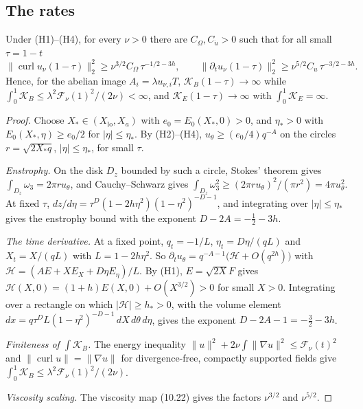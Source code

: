 \subsection{The rates}

\begin{theorem}\label{thm:rates}
Under (H1)--(H4), for every $\nu>0$ there are $C_\Omega,C_{\dot u}>0$ such that for all small $\tau=1-t$
\[
\|\operatorname{curl}u_\nu(1-\tau)\|_2^2\ge\nu^{3/2}C_\Omega\,\tau^{-1/2-3h},\qquad \|\partial_tu_\nu(1-\tau)\|_2^2\ge\nu^{5/2}C_{\dot u}\,\tau^{-3/2-3h}.
\]
Hence, for the abelian image $A_i=\lambda u_{\nu,i}T$, $\mathcal K_B(1-\tau)\to\infty$ while $\int_0^1\mathcal K_B\le\lambda^2\mathcal F_\nu(1)^2/(2\nu)<\infty$, and $\mathcal K_E(1-\tau)\to\infty$ with $\int_0^1\mathcal K_E=\infty$.
\end{theorem}
\begin{proof}
Choose $X_*\in(X_{\mathrm{lo}},X_a)$ with $e_0=E_0(X_*,0)>0$, and $\eta_*>0$ with $E_0(X_*,\eta)\ge e_0/2$ for $|\eta|\le\eta_*$. By (H2)--(H4), $u_\theta\ge(e_0/4)q^{-A}$ on the circles $r=\sqrt{2X_*q}$, $|\eta|\le\eta_*$, for small $\tau$.

\emph{Enstrophy.} On the disk $D_z$ bounded by such a circle, Stokes' theorem gives $\int_{D_z}\omega_3=2\pi r u_\theta$, and Cauchy--Schwarz gives $\int_{D_z}\omega_3^2\ge(2\pi ru_\theta)^2/(\pi r^2)=4\pi u_\theta^2$. At fixed $\tau$, $dz/d\eta=\tau^D(1-2h\eta^2)(1-\eta^2)^{-D-1}$, and integrating over $|\eta|\le\eta_*$ gives the enstrophy bound with the exponent $D-2A=-\frac12-3h$.

\emph{The time derivative.} At a fixed point, $q_t=-1/L$, $\eta_t=D\eta/(qL)$ and $X_t=X/(qL)$ with $L=1-2h\eta^2$. So $\partial_tu_\theta=q^{-A-1}\bigl(\mathcal H+O(q^{2h})\bigr)$ with $\mathcal H=(AE+XE_X+D\eta E_\eta)/L$. By (H1), $E=\sqrt{2X}F$ gives $\mathcal H(X,0)=(1+h)E(X,0)+O(X^{3/2})>0$ for small $X>0$. Integrating over a rectangle on which $|\mathcal H|\ge h_*>0$, with the volume element $dx=q\tau^DL(1-\eta^2)^{-D-1}\,dX\,d\theta\,d\eta$, gives the exponent $D-2A-1=-\frac32-3h$.

\emph{Finiteness of $\int\mathcal K_B$.} The energy inequality $\|u\|^2+2\nu\int\|\nabla u\|^2\le\mathcal F_\nu(t)^2$ and $\|\operatorname{curl}u\|=\|\nabla u\|$ for divergence-free, compactly supported fields give $\int_0^1\mathcal K_B\le\lambda^2\mathcal F_\nu(1)^2/(2\nu)$.

\emph{Viscosity scaling.} The viscosity map (10.22) gives the factors $\nu^{3/2}$ and $\nu^{5/2}$.
\end{proof}

